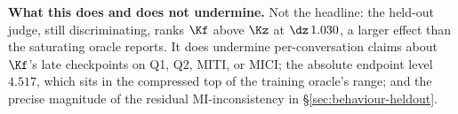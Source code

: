 \textbf{What this does and does not undermine.} Not the headline: the held-out judge, still
discriminating, ranks $\Kf$ above $\Kz$ at $\dz\,1.030$, a larger effect than the saturating
oracle reports. It does undermine per-conversation claims about $\Kf$'s late checkpoints on Q1,
Q2, MITI, or MICI; the absolute endpoint level $4.517$, which sits in the compressed top of the
training oracle's range; and the precise magnitude of the residual MI-inconsistency in
\S\ref{sec:behaviour-heldout}.
